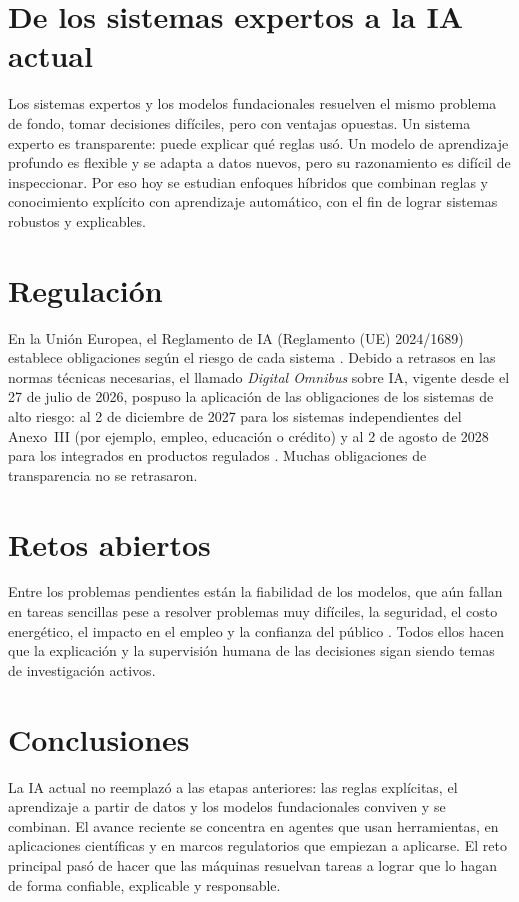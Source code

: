 \documentclass[11pt,a4paper]{article}
\begin{document}
\section{De los sistemas expertos a la IA actual}
Los sistemas expertos y los modelos fundacionales resuelven el mismo problema de fondo, tomar decisiones difíciles, pero con ventajas opuestas. Un sistema experto es transparente: puede explicar qué reglas usó. Un modelo de aprendizaje profundo es flexible y se adapta a datos nuevos, pero su razonamiento es difícil de inspeccionar. Por eso hoy se estudian enfoques híbridos que combinan reglas y conocimiento explícito con aprendizaje automático, con el fin de lograr sistemas robustos y explicables.

\section{Regulación}
En la Unión Europea, el Reglamento de IA (Reglamento (UE) 2024/1689) establece obligaciones según el riesgo de cada sistema \cite{eu2024}. Debido a retrasos en las normas técnicas necesarias, el llamado \emph{Digital Omnibus} sobre IA, vigente desde el 27 de julio de 2026, pospuso la aplicación de las obligaciones de los sistemas de alto riesgo: al 2 de diciembre de 2027 para los sistemas independientes del Anexo~III (por ejemplo, empleo, educación o crédito) y al 2 de agosto de 2028 para los integrados en productos regulados \cite{legal500}. Muchas obligaciones de transparencia no se retrasaron.

\section{Retos abiertos}
Entre los problemas pendientes están la fiabilidad de los modelos, que aún fallan en tareas sencillas pese a resolver problemas muy difíciles, la seguridad, el costo energético, el impacto en el empleo y la confianza del público \cite{aiindex2026}. Todos ellos hacen que la explicación y la supervisión humana de las decisiones sigan siendo temas de investigación activos.

\section{Conclusiones}
La IA actual no reemplazó a las etapas anteriores: las reglas explícitas, el aprendizaje a partir de datos y los modelos fundacionales conviven y se combinan. El avance reciente se concentra en agentes que usan herramientas, en aplicaciones científicas y en marcos regulatorios que empiezan a aplicarse. El reto principal pasó de hacer que las máquinas resuelvan tareas a lograr que lo hagan de forma confiable, explicable y responsable.
\end{document}
